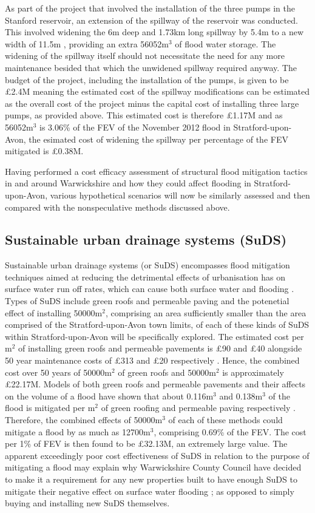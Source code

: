 \documentclass[11pt,a4paper]{article}
\begin{document}
As part of the project that involved the installation of the three pumps in the Stanford reservoir, an extension of the spillway of the reservoir was conducted. This involved widening the 6m deep and 1.73km long spillway by 5.4m to a new width of 11.5m \cite{spillway}, providing an extra 56052m$^3$ of flood water storage. The widening of the spillway itself should not necessitate the need for any more maintenance besided that which the unwidened spillway required anyway. The budget of the project, including the installation of the pumps, is given to be \pounds2.4M \cite{spillway} meaning the estimated cost of the spillway modifications can be estimated as the overall cost of the project minus the capital cost of installing three large pumps, as provided above. This estimated cost is therefore \pounds1.17M and as 56052m$^3$ is 3.06\% of the FEV of the November 2012 flood in Stratford-upon-Avon, the esimated cost of widening the spillway per percentage of the FEV mitigated is \pounds0.38M.

Having performed a cost efficacy assessment of structural flood mitigation tactics in and around Warwickshire and how they could affect flooding in Stratford-upon-Avon, various hypothetical scenarios will now be similarly assessed and then compared with the nonspeculative methods discussed above.

\subsection{Sustainable urban drainage systems (SuDS)}
Sustainable urban drainage systems (or SuDS) encompasses flood mitigation techniques aimed at reducing the detrimental effects of urbanisation has on surface water run off rates, which can cause both surface water and flooding \cite{suds}. Types of SuDS include green roofs and permeable paving and the potenetial effect of installing 50000m$^2$, comprising an area sufficiently smaller than the area comprised of the Stratford-upon-Avon town limits, of each of these kinds of SuDS within Stratford-upon-Avon will be specifically explored. The estimated cost per m$^2$ of installing green roofs and permeable pavements is \pounds90 and \pounds40 alongside 50 year maintenance costs of \pounds313 and \pounds20 respectively \cite{cost3}. Hence, the combined cost over 50 years of 50000m$^2$ of green roofs and 50000m$^2$ is approximately \pounds22.17M. Models of both green roofs and permeable pavements and their affects on the volume of a flood have shown that about 0.116m$^3$ and 0.138m$^3$ of the flood is mitigated per m$^2$ of green roofing and permeable paving respectively \cite{suds}. Therefore, the combined effects of 50000m$^3$ of each of these methods could mitigate a flood by as much as 12700m$^3$, comprising 0.69\% of the FEV. The cost per 1\% of FEV is then found to be \pounds32.13M, an extremely large value. The apparent exceedingly poor cost effectiveness of SuDS in relation to the purpose of mitigating a flood may explain why Warwickshire County Council have decided to make it a requirement for any new properties built to have enough SuDS to mitigate their negative effect on surface water flooding \cite{war2}{;} as opposed to simply buying and installing new SuDS themselves.
\end{document}
